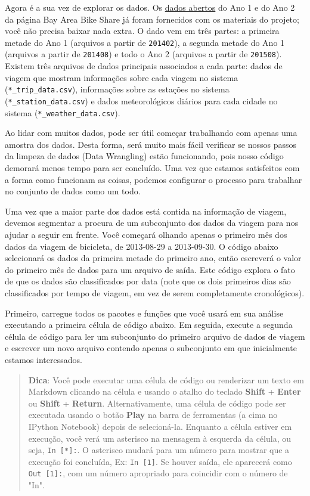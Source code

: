 \documentclass[11pt]{article}
\begin{document}
Agora é a sua vez de explorar os dados. Os
\href{http://www.bayareabikeshare.com/open-data}{dados abertos} do Ano 1
e do Ano 2 da página Bay Area Bike Share já foram fornecidos com os
materiais do projeto; você não precisa baixar nada extra. O dado vem em
três partes: a primeira metade do Ano 1 (arquivos a partir de
\texttt{201402}), a segunda metade do Ano 1 (arquivos a partir de
\texttt{201408}) e todo o Ano 2 (arquivos a partir de \texttt{201508}).
Existem três arquivos de dados principais associados a cada parte: dados
de viagem que mostram informações sobre cada viagem no sistema
(\texttt{*\_trip\_data.csv}), informações sobre as estações no sistema
(\texttt{*\_station\_data.csv}) e dados meteorológicos diários para cada
cidade no sistema (\texttt{*\_weather\_data.csv}).

Ao lidar com muitos dados, pode ser útil começar trabalhando com apenas
uma amostra dos dados. Desta forma, será muito mais fácil verificar se
nossos passos da limpeza de dados (Data Wrangling) estão funcionando,
pois nosso código demorará menos tempo para ser concluído. Uma vez que
estamos satisfeitos com a forma como funcionam as coisas, podemos
configurar o processo para trabalhar no conjunto de dados como um todo.

Uma vez que a maior parte dos dados está contida na informação de
viagem, devemos segmentar a procura de um subconjunto dos dados da
viagem para nos ajudar a seguir em frente. Você começará olhando apenas
o primeiro mês dos dados da viagem de bicicleta, de 2013-08-29 a
2013-09-30. O código abaixo selecionará os dados da primeira metade do
primeiro ano, então escreverá o valor do primeiro mês de dados para um
arquivo de saída. Este código explora o fato de que os dados são
classificados por data (note que os dois primeiros dias são
classificados por tempo de viagem, em vez de serem completamente
cronológicos).

Primeiro, carregue todos os pacotes e funções que você usará em sua
análise executando a primeira célula de código abaixo. Em seguida,
execute a segunda célula de código para ler um subconjunto do primeiro
arquivo de dados de viagem e escrever um novo arquivo contendo apenas o
subconjunto em que inicialmente estamos interessados.

\begin{quote}
\textbf{Dica}: Você pode executar uma célula de código ou renderizar um
texto em Markdown clicando na célula e usando o atalho do teclado
\textbf{Shift} + \textbf{Enter} ou \textbf{Shift} + \textbf{Return}.
Alternativamente, uma célula de código pode ser executada usando o botão
\textbf{Play} na barra de ferramentas (a cima no IPython Notebook)
depois de selecioná-la. Enquanto a célula estiver em execução, você verá
um asterisco na mensagem à esquerda da célula, ou seja,
\texttt{In\ {[}*{]}:}. O asterisco mudará para um número para mostrar
que a execução foi concluída, Ex: \texttt{In\ {[}1{]}}. Se houver saída,
ele aparecerá como \texttt{Out\ {[}1{]}:}, com um número apropriado para
coincidir com o número de "In".
\end{quote}
\end{document}
